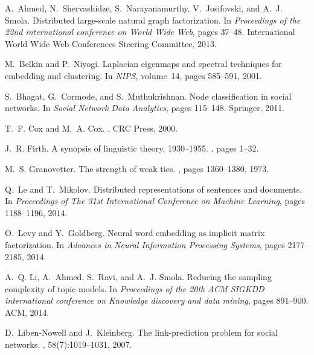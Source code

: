 \documentclass{sig-alternate-2013}
\begin{document}
\begin{thebibliography}{10}
	
	A.~Ahmed, N.~Shervashidze, S.~Narayanamurthy, V.~Josifovski, and A.~J. Smola.
	\newblock Distributed large-scale natural graph factorization.
	\newblock In {\em Proceedings of the 22nd international conference on World
		Wide Web}, pages 37--48. International World Wide Web Conferences Steering
	Committee, 2013.
	
	M.~Belkin and P.~Niyogi.
	\newblock Laplacian eigenmaps and spectral techniques for embedding and
	clustering.
	\newblock In {\em NIPS}, volume~14, pages 585--591, 2001.
	
	S.~Bhagat, G.~Cormode, and S.~Muthukrishnan.
	\newblock Node classification in social networks.
	\newblock In {\em Social Network Data Analytics}, pages 115--148. Springer,
	2011.
	
	T.~F. Cox and M.~A. Cox.
	.
	\newblock CRC Press, 2000.
	
	J.~R. Firth.
	\newblock A synopsis of linguistic theory, 1930--1955.
	, pages
	1--32.
	
	M.~S. Granovetter.
	\newblock The strength of weak ties.
	, pages 1360--1380, 1973.
	
	Q.~Le and T.~Mikolov.
	\newblock Distributed representations of sentences and documents.
	\newblock In {\em Proceedings of The 31st International Conference on Machine
		Learning}, pages 1188--1196, 2014.
	
	O.~Levy and Y.~Goldberg.
	\newblock Neural word embedding as implicit matrix factorization.
	\newblock In {\em Advances in Neural Information Processing Systems}, pages
	2177--2185, 2014.
	
	A.~Q. Li, A.~Ahmed, S.~Ravi, and A.~J. Smola.
	\newblock Reducing the sampling complexity of topic models.
	\newblock In {\em Proceedings of the 20th ACM SIGKDD international conference
		on Knowledge discovery and data mining}, pages 891--900. ACM, 2014.
	
	D.~Liben-Nowell and J.~Kleinberg.
	\newblock The link-prediction problem for social networks.
	, 58(7):1019--1031, 2007.
	

\end{thebibliography}
\end{document}
